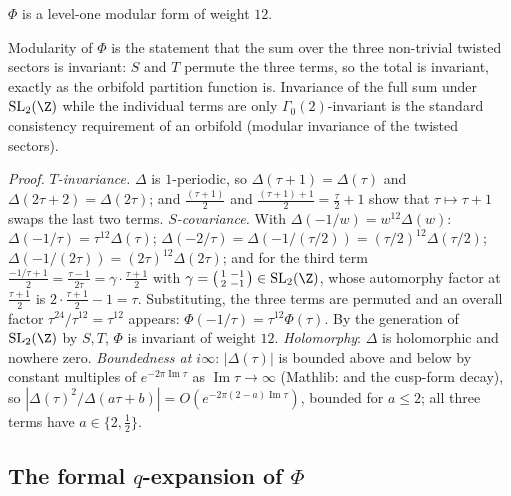 \begin{theorem}\label{ch05:thm:phimod}
$\Phi$ is a level-one modular form of weight $12$.
\end{theorem}

\begin{physics}
Modularity of $\Phi$ is the statement that the sum over the three non-trivial twisted sectors is invariant: $S$ and $T$ permute the three terms, so the total is invariant, exactly as the orbifold partition function is. Invariance of the full sum under $\mathrm{SL}_2(\Z)$ while the individual terms are only $\Gamma_0(2)$-invariant is the standard consistency requirement of an orbifold (modular invariance of the twisted sectors).
\end{physics}
\noindent\emph{Proof.}
\emph{$T$-invariance.} $\Delta$ is $1$-periodic, so $\Delta(\tau+1)=\Delta(\tau)$ and $\Delta(2\tau+2) = \Delta(2\tau)$; and
$\tfrac{(\tau+1)}2$ and $\tfrac{(\tau+1)+1}{2} = \tfrac\tau2 + 1$ show that $\tau\mapsto\tau+1$ swaps the last two
terms. \emph{$S$-covariance.} With $\Delta(-1/w) = w^{12}\Delta(w)$:
$\Delta(-1/\tau) = \tau^{12}\Delta(\tau)$; $\Delta(-2/\tau) = \Delta(-1/(\tau/2)) = (\tau/2)^{12}\Delta(\tau/2)$; $\Delta(-1/(2\tau)) =
(2\tau)^{12}\Delta(2\tau)$; and for the third term $\tfrac{-1/\tau + 1}{2} = \tfrac{\tau - 1}{2\tau} = \gamma\cdot\tfrac{\tau+1}2$
with $\gamma = \bigl(\begin{smallmatrix}1&-1\\2&-1\end{smallmatrix}\bigr)\in\chfiveSL$, whose automorphy factor at
$\tfrac{\tau+1}2$ is $2\cdot\tfrac{\tau+1}2 - 1 = \tau$. Substituting, the three terms are permuted and an
overall factor $\tau^{24}/\tau^{12} = \tau^{12}$ appears: $\Phi(-1/\tau) = \tau^{12}\Phi(\tau)$. By the generation
of $\chfiveSL$ by $S,T$, $\Phi$ is invariant of weight $12$. \emph{Holomorphy}: $\Delta$ is holomorphic and
nowhere zero. \emph{Boundedness at $i\infty$}: $|\Delta(\tau)|$ is bounded above and below by constant
multiples of $e^{-2\pi\operatorname{Im}\tau}$ as $\operatorname{Im}\tau\to\infty$ (Mathlib:
 and the cusp-form decay), so $|\Delta(\tau)^2/\Delta(a\tau+b)| = O(e^{-2\pi(2-a)
\operatorname{Im}\tau})$, bounded for $a\le2$; all three terms have $a\in\{2,\tfrac12\}$.

\subsection{The formal \texorpdfstring{$q$}{q}-expansion of \texorpdfstring{$\Phi$}{Phi}}

